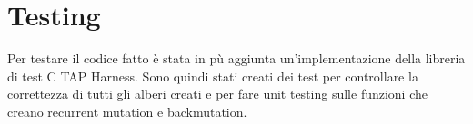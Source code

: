 \documentclass[12pt]{report}
\begin{document}
  \section{Testing}

  Per testare il codice fatto è stata in pù aggiunta un'implementazione della libreria di test C TAP Harness\cite{C-TAP}. Sono quindi stati creati dei test per controllare la correttezza di tutti gli alberi creati e per fare unit testing sulle funzioni che creano recurrent mutation e backmutation.

\singlespacing
{}
\printbibliography[title={Bibliografia e sitografia}]
\end{document}
